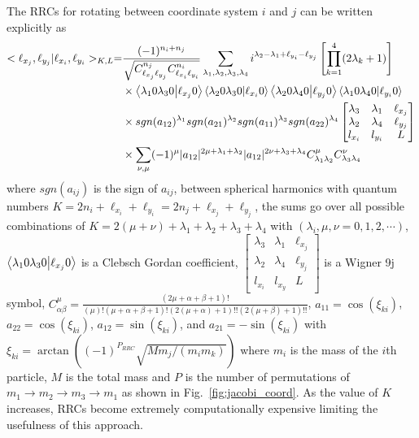 The RRCs for rotating between coordinate system $i$ and $j$ can be written explicitly as
\begin{align}
\nonumber
    <\ell_{x_j},\ell_{y_j}|\ell_{x_i},\ell_{y_i}>_{K,L} =& \frac{(-1)^{n_i+n_j}}{\sqrt{C_{\ell_{x_j}\ell_{y_j}}^{n_j}C_{\ell_{x_i}\ell_{y_i}}^{n_i}}} \sum\limits_{\lambda_1,\lambda_2,\lambda_3,\lambda_4} i^{\lambda_2-\lambda_1+\ell_{y_i}-\ell_{y_j}}\left[\prod_{k=1}^4 (2\lambda_k +1)\right] \\ 
\nonumber
    & \times \braket{\lambda_1 0 \lambda_3 0}{\ell_{x_j} 0} \braket{\lambda_2 0 \lambda_3 0}{\ell_{x_i} 0} \braket{\lambda_2 0 \lambda_4 0}{\ell_{y_j} 0} \braket{\lambda_1 0 \lambda_4 0}{\ell_{y_i} 0} \\
\nonumber
    & \times sgn(a_{12})^{\lambda_1}sgn(a_{21})^{\lambda_2}sgn(a_{11})^{\lambda_3}sgn(a_{22})^{\lambda_4} \begin{bmatrix}
   \lambda_3 & \lambda_1 & \ell_{x_j} \\
   \lambda_2 & \lambda_4 & \ell_{y_j} \\
   l_{x_i}   & l_{y_i}   & L
   \end{bmatrix} \\
    & \times \sum\limits_{\nu,\mu} (-1)^{\mu}|a_{12}|^{2\mu + \lambda_1 + \lambda_2} |a_{12}|^{2\nu + \lambda_3 + \lambda_4} C_{\lambda_1 \lambda_2}^{\mu} C_{\lambda_3 \lambda_4}^{\nu}
    \label{eq:RRC}
\end{align}
where $sgn(a_{ij})$ is the sign of $a_{ij}$, between spherical harmonics with quantum numbers $K=2n_i+\ell_{x_i}+\ell_{y_i}=2n_j+\ell_{x_j}+\ell_{y_j}$, the sums go over all possible combinations of $K=2(\mu+\nu)+\lambda_1+\lambda_2+\lambda_3+\lambda_4$ with $(\lambda_i, \mu, \nu = 0,1,2,\cdots)$, $\braket{\lambda_1 0 \lambda_3 0}{\ell_{x_j} 0}$ is a Clebsch Gordan coefficient,
     $\begin{bmatrix}
        \lambda_3 & \lambda_1 & \ell_{x_j} \\
        \lambda_2 & \lambda_4 & \ell_{y_j} \\
        l_{x_i}   & l_{x_y}   & L
        \end{bmatrix}$
is a Wigner 9j symbol, 
    $C_{\alpha\beta}^\mu = \frac{(2\mu+\alpha+\beta+1)!}{(\mu)!(\mu+\alpha+\beta+1)!(2(\mu+\alpha)+1)!!(2(\mu+\beta)+1)!!}$,
$a_{11} = \cos(\xi_{ki})$,
$a_{22} = \cos(\xi_{ki})$,
$a_{12} = \sin(\xi_{ki})$, and 
$a_{21} = -\sin(\xi_{ki})$
with $\xi_{ki} = \arctan((-1)^{P_{RRC}}\sqrt{Mm_j/(m_i m_k)})$ where $m_i$ is the mass of the $i$th particle, $M$ is the total mass and $P$ is the number of permutations of $m_1\rightarrow m_2\rightarrow m_3\rightarrow m_1$  as shown in Fig.~\ref{fig:jacobi_coord}. As the value of $K$ increases, RRCs become extremely computationally expensive limiting the usefulness of this approach.


